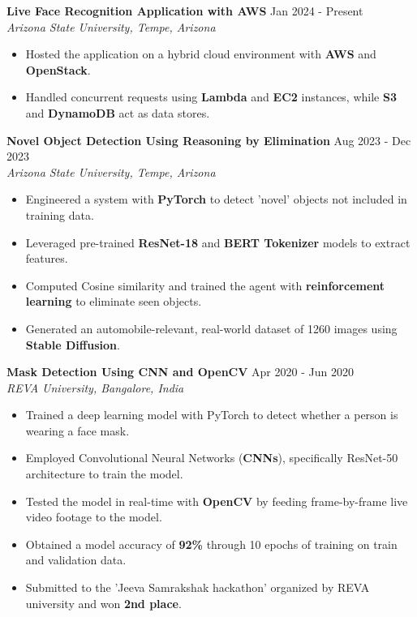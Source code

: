 \documentclass[a4paper,9pt]{extarticle}
\begin{document}
\noindent
\textbf{Live Face Recognition Application with AWS}  \hfill Jan 2024 - Present\\ %
\textit{Arizona State University, Tempe, Arizona} %
\begin{itemize}
    \item Hosted the application on a hybrid cloud environment with \textbf{AWS} and \textbf{OpenStack}.
    \item Handled concurrent requests using \textbf{Lambda} and \textbf{EC2} instances, while \textbf{S3} and \textbf{DynamoDB} act as data stores.
\end{itemize}

\noindent
\textbf{Novel Object Detection Using Reasoning by Elimination} \hfill Aug 2023 - Dec 2023\\%
\textit{Arizona State University, Tempe, Arizona}
\begin{itemize}
    \item Engineered a system with \textbf{PyTorch} to detect 'novel' objects not included in training data.
    \item Leveraged pre-trained \textbf{ResNet-18} and \textbf{BERT Tokenizer} models to extract features. 
    \item Computed Cosine similarity and trained the agent with \textbf{reinforcement learning} to eliminate seen objects.
    \item Generated an automobile-relevant, real-world dataset of 1260 images using \textbf{Stable Diffusion}. %
\end{itemize}

\noindent
\textbf{Mask Detection Using CNN and OpenCV} \hfill Apr 2020 - Jun 2020\\ %
\textit{REVA University, Bangalore, India}  
\begin{itemize}
    \item Trained a deep learning model with PyTorch to detect whether a person is wearing a face mask.
    \item Employed Convolutional Neural Networks (\textbf{CNNs}), specifically ResNet-50 architecture to train the model.
    \item Tested the model in real-time with \textbf{OpenCV} by feeding frame-by-frame live video footage to the model.
    \item Obtained a model accuracy of \textbf{92\%} through 10 epochs of training on train and validation data.
    \item Submitted to the 'Jeeva Samrakshak hackathon' organized by REVA university and won \textbf{2nd place}.  %
\end{itemize}
\end{document}
